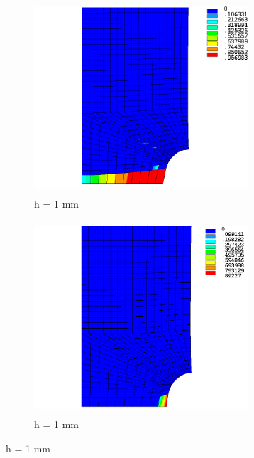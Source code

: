\documentclass[12pt]{report}
\begin{document}
\begin{figure}[htbp!]
     \begin{subfigure}{0.4\textwidth}
         \includegraphics[width=8cm,height=7.2cm,keepaspectratio]{25.d1-1-r.png}
         \caption{h = 1 mm}
         \label{fig:d1-1-r}
     \end{subfigure}
    \hspace{1.8cm}
     \captionsetup[subfigure]{justification=centering}
     \begin{subfigure}{0.4\textwidth}
         \includegraphics[width=8cm,height=7.2cm,keepaspectratio]{25.d1-1-nr.png}
         \caption{h = 1 mm}
         \label{fig:d1-1-nr}
     \end{subfigure}
\end{figure}
\FloatBarrier
\end{document}

